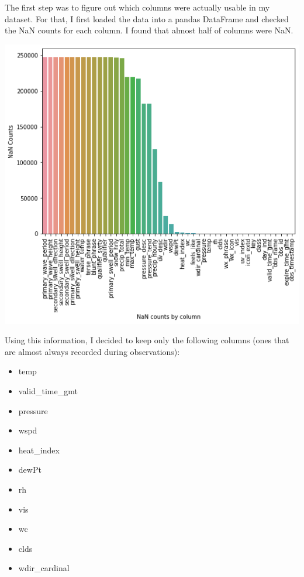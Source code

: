 \documentclass[paper=a4, fontsize=11pt, margin=1in]{scrartcl}
\numberwithin{equation}{section}		%
\numberwithin{figure}{section}			%
\numberwithin{table}{section}				%
\begin{document}
The first step was to figure out which columns were actually usable in my dataset. For that, I first loaded the data into a pandas DataFrame and checked the NaN counts for each column. I found that almost half of columns were NaN. \\

\begin{center}
\includegraphics[width=\textwidth]{nan-counts.png}
\end{center}

Using this information, I decided to keep only the following columns (ones that are almost always recorded during observations):\\
\raggedcolumns
\begin{multicols}{4}
\begin{itemize}
\item temp
\item valid\_time\_gmt
\item pressure
\item wspd
\item heat\_index
\item dewPt
\item rh 
\item vis 
\item wc 
\item clds 
\item wdir\_cardinal
\end{itemize}
\end{multicols}
\end{document}

